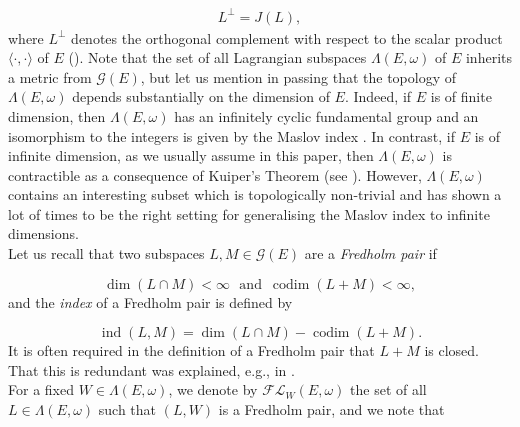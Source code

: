\documentclass[a4paper,10pt]{article}
\DeclareMathOperator{\ind}{ind}
\DeclareMathOperator{\codim}{codim}
\begin{document}
\begin{align}\label{Lperp=JL}
L^\perp=J(L),
\end{align}
where $L^\perp$ denotes the orthogonal complement with respect to the scalar product $\langle\cdot,\cdot\rangle$ of $E$ (\cite[Prop. 1.7]{Furutani}). Note that the set of all Lagrangian subspaces $\Lambda(E,\omega)$ of $E$ inherits a metric from $\mathcal{G}(E)$, but let us mention in passing that the topology of $\Lambda(E,\omega)$ depends substantially on the dimension of $E$. Indeed, if $E$ is of finite dimension, then $\Lambda(E,\omega)$ has an infinitely cyclic fundamental group and an isomorphism to the integers is given by the Maslov index \cite{Maslov}. In contrast, if $E$ is of infinite dimension, as we usually assume in this paper, then $\Lambda(E,\omega)$ is contractible as a consequence of Kuiper's Theorem (see \cite[Thm. 1.14]{Furutani}). However, $\Lambda(E,\omega)$ contains an interesting subset which is topologically non-trivial and has shown a lot of times to be the right setting for generalising the Maslov index to infinite dimensions.\\
Let us recall that two subspaces $L,M\in\mathcal{G}(E)$ are a \textit{Fredholm pair} if

\[\dim(L\cap M)<\infty\,\, \text{ and }\, \codim(L+M)<\infty,\]
and the \textit{index} of a Fredholm pair is defined by

\[\ind(L,M)=\dim(L\cap M)-\codim(L+M).\] 
It is often required in the definition of a Fredholm pair that $L+M$ is closed. That this is redundant was explained, e.g., in \cite{BoossFurutani}.\\
For a fixed $W\in\Lambda(E,\omega)$, we denote by $\mathcal{FL}_W(E,\omega)$ the set of all $L\in\Lambda(E,\omega)$ such that $(L,W)$ is a Fredholm pair, and we note that 
\end{document}

